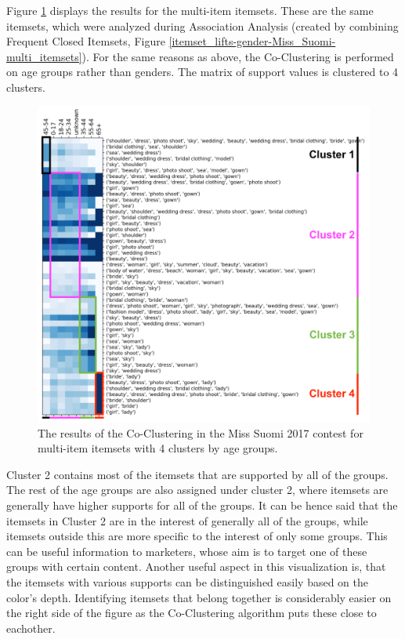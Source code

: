 Figure \ref{coclustering_miss-suomi-age_groups-multi-itemsets-4_clusters} displays the results for the multi-item itemsets. These are the same itemsets, which were analyzed during Association Analysis (created by combining Frequent Closed Itemsets, Figure \ref{itemset_lifts-gender-Miss_Suomi-multi_itemsets}). For the same reasons as above, the Co-Clustering is performed on age groups rather than genders. The matrix of support values is clustered to 4 clusters. 

\begin{figure}[] 
    \begin{center}
        \includegraphics[width=1\textwidth]{Images/coclustering_miss-suomi-age_groups-multi-itemsets-4_clusters_cropped.png}
        \caption{The results of the Co-Clustering in the Miss Suomi 2017 contest for multi-item itemsets with 4 clusters by age groups.}
        \label{coclustering_miss-suomi-age_groups-multi-itemsets-4_clusters}
    \end{center}
\end{figure}

Cluster 2 contains most of the itemsets that are supported by all of the groups. The rest of the age groups are also assigned under cluster 2, where itemsets are generally have higher supports for all of the groups. It can be hence said that the itemsets in Cluster 2 are in the interest of generally all of the groups, while itemsets outside this are more specific to the interest of only some groups. This can be useful information to marketers, whose aim is to target one of these groups with certain content. Another useful aspect in this visualization is, that the itemsets with various supports can be distinguished easily based on the color's depth. Identifying itemsets that belong together is considerably easier on the right side of the figure as the Co-Clustering algorithm puts these close to eachother. 

